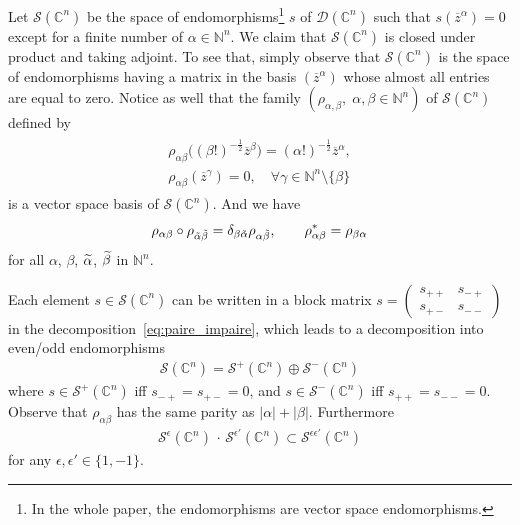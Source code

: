 \documentclass[10pt,a4paper]{article}
\theoremstyle{definition}
\numberwithin{equation}{section}
\newcommand{\N}{{\mathbb{N}}}
\newcommand{\C}{{\mathbb{C}}}
\newcommand{\be}{{\beta}}
\newcommand{\al}{{\alpha}}
\newcommand{\ga}{{\gamma}}
\newcommand{\ep}{\epsilon}
\newcommand{\con}{\overline}
\newcommand{\D}{\mathcal{D}}
\newcommand{\symb}{\mathcal{S}}
\newcommand{\Uu}{\rho}
\let\oldtilde\tilde
\renewcommand*{\tilde}[1]{\mathchoice{\widetilde{#1}}{\widetilde{#1}}{\oldtilde{#1}}{\oldtilde{#1}}}
\let\oldforall\forall
\renewcommand*{\forall}{\mathrel{\oldforall}}
\begin{document}
Let $\symb (\C^n)$ be the space of endomorphisms\footnote{
In the whole paper, the endomorphisms are vector space endomorphisms.
}
$s $ of $\D(\C^n)$ such that $s (\con{z}^\al) = 0$ except for a finite number of $\al \in
\N^{n}$. We claim that $\symb (\C^n)$ is closed under product and taking adjoint. To see that, simply observe that $\symb (\C^n)$ is the space of endomorphisms having a matrix in the basis $(\con{z}^\al)$ whose almost all entries are equal to zero. Notice as well that the family $(\Uu_{\al, \be}, \;
\al, \be \in \N^n)$ of $\symb (\C^n)$ defined by
\begin{gather}\label{eq:def_Ualphabeta}
\begin{split}
\Uu_{\al \be } \bigl((\be !)^{-\frac{1}{2}} \con{z}^\be \bigr) = (\al !)^{-\frac{1}{2}}
\con{z}^{\al}, \\ 
\Uu_{\al \be} (\con{z}^{\ga}) = 0, \quad \forall \ga \in \N^n
\setminus \{ \be \}
\end{split}
\end{gather}
is a vector space basis of $\symb (\C^{n})$. And we have
\begin{gather}\label{eq:rel_U}
\Uu_{\al \be} \circ \Uu_{\tilde \al \tilde \be } = \delta_{\be \tilde{\al}}
\Uu_{\al \tilde \be}, \qquad \Uu_{\al \be}^* =
\Uu_{\be \al}
\end{gather}
for all $\al$, $\be$, $\tilde \al$, $\tilde \be$ in $\N^n$.

Each element $s \in \symb (\C^n)$ can be written in a block matrix $s =
(\begin{smallmatrix} s_{++} & s_{-+}
\\ s _{+-} & s_{--}
\end{smallmatrix})$ in the decomposition~\eqref{eq:paire_impaire}, which leads to a decomposition into even/odd endomorphisms
\begin{gather}\label{eq:symb+_-}
\symb (\C^n) = \symb^{+} (\C^n) \oplus \symb^{-} (\C^n)
\end{gather}
where $s \in \symb^{+} (\C^n)$ iff $s_{-+} = s_{+-} =0$, and $s \in
\symb^{-} (\C^n)$ iff $s_{++} = s_{--} = 0 $. Observe that $\Uu_{\al\be}$ has the same parity as $|\al | + | \be|$. Furthermore
\begin{gather}
\symb^{\ep} (\C^n)\, \cdot \, \symb^{\ep'} (\C^n) \subset
\symb^{\ep \ep'} (\C^n)
\end{gather}
for any $\ep, \ep' \in \{ 1, -1 \}$.
\end{document}

